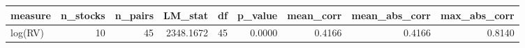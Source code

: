 \begin{tabular}{lrrrrrrrr}
\toprule
measure & n_stocks & n_pairs & LM_stat & df & p_value & mean_corr & mean_abs_corr & max_abs_corr \\
\midrule
log(RV) & 10 & 45 & 2348.1672 & 45 & 0.0000 & 0.4166 & 0.4166 & 0.8140 \\
\bottomrule
\end{tabular}
